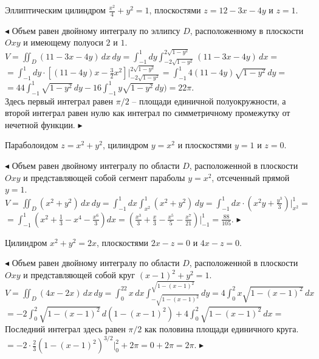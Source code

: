 \documentclass[a5paper,10pt]{article}
\begin{document}
\medskip
{} Эллиптическим цилиндром $\displaystyle \frac{x^2}{4}+y^2=1$,
плоскостями $z=12-3x-4y$ и $z=1$.

\smallskip
\noindent $\blacktriangleleft$ Объем равен двойному интегралу по эллипсу $D$,
расположенному в плоскости $Oxy$ и имеющему полуоси $2$ и $1$.\\
$\displaystyle V=\iint_D(11-3x-4y)\,dx\,dy=
\int_{-1}^1dy\int_{-2\sqrt{1-y^2}}^{2\sqrt{1-y^2}}(11-3x-4y)\,dx=$\\
$\displaystyle=\int_{-1}^1dy\cdot\left[(11-4y)x-\frac32x^2\right]\Big|_{-2\sqrt{1-y^2}}^{2\sqrt{1-y^2}}=
\int_{-1}^1 4(11-4y)\sqrt{1-y^2}\,dy=$\\
$\displaystyle=44\int_{-1}^1 \sqrt{1-y^2}\,dy-16\int_{-1}^1 y\sqrt{1-y^2}\,dy)=22\pi.$\\
Здесь первый интеграл равен $\pi/2$ -- площади единичной полуокружности, а второй интеграл равен нулю как интеграл по симметричному промежутку от нечетной функции.
$\blacktriangleright$

\medskip
{} Параболоидом $z=x^2+y^2$, цилиндром $y=x^2$ и плоскостями $y=1$ и $z=0$.

\smallskip
\noindent $\blacktriangleleft$ Объем равен двойному интегралу по области $D$, расположенной в плоскости
$Oxy$ и представляющей собой сегмент параболы $y=x^2$, отсеченный прямой $y=1$.\\
$\displaystyle V=\iint_D(x^2+y^2)\,dx\,dy=\int_{-1}^1dx\int_{x^2}^{1}(x^2+y^2)\,dy=
\int_{-1}^1dx\cdot\left(x^2y+\frac{y^3}{3}\right)\Big|_{x^2}^{1}=$\\
$\displaystyle =\int_{-1}^1\left(x^2+\frac{1}{3}-x^4-\frac{x^6}{3}\right)dx=
\left(\frac{x^3}{3}+\frac{x}{3}-\frac{x^5}{5}-\frac{x^7}{21}\right)\Big|_{-1}^1=\frac{88}{105}.$
$\blacktriangleright$

\medskip
{} Цилиндром $x^2+y^2=2x$, плоскостями $2x-z=0$ и $4x-z=0$.

\smallskip
\noindent $\blacktriangleleft$ Объем равен двойному интегралу по области $D$, расположенной в плоскости
$Oxy$ и представляющей собой круг $(x-1)^2+y^2=1$.\\
$\displaystyle V=\iint_D(4x-2x)\,dx\,dy=\int_{0}^22x\,dx\int_{-\sqrt{1-(x-1)^2}}^{\sqrt{1-(x-1)^2}}dy=
4\int_0^2x\sqrt{1-(x-1)^2}\,dx$\\
$\displaystyle =-2\int_0^2\sqrt{1-(x-1)^2}\,d(1-(x-1)^2)+4\int_0^2\sqrt{1-(x-1)^2}\,dx=$\\
Последний интеграл здесь равен $\pi/2$ как половина площади единичного круга.\\
$\displaystyle =-2\cdot\frac23(1-(x-1)^2)^{3/2}\Big|_0^2+2\pi=0+2\pi=2\pi.$
$\blacktriangleright$
\end{document}
